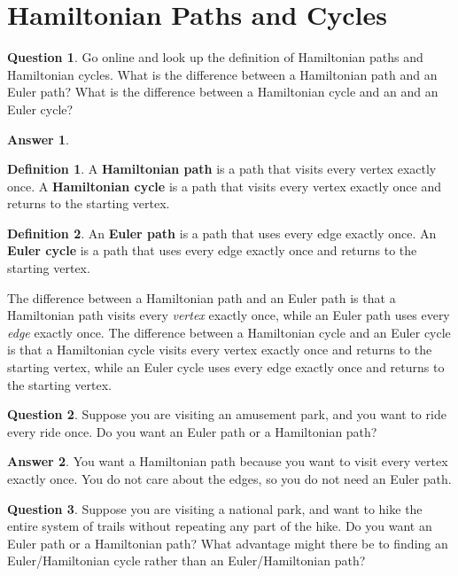 \documentclass[article, 12pt]{article}
\theoremstyle{definition}
\newtheorem{definition}{Definition}
\newtheorem{question}{Question}
\newtheorem{answer}{Answer}
\begin{document}
    \section{Hamiltonian Paths and Cycles}
    \begin{question}
        Go online and look up the definition of Hamiltonian paths and Hamiltonian cycles. What is the difference between a Hamiltonian path and an Euler path? What is the difference between a Hamiltonian cycle and an and an Euler cycle?
    \end{question}
    \begin{answer}
        \begin{definition}
            A \textbf{Hamiltonian path} is a path that visits every vertex exactly once. A \textbf{Hamiltonian cycle} is a path that visits every vertex exactly once and returns to the starting vertex.
        \end{definition}
        \begin{definition}
            An \textbf{Euler path} is a path that uses every edge exactly once. An \textbf{Euler cycle} is a path that uses every edge exactly once and returns to the starting vertex. 
        \end{definition} 
        The difference between a Hamiltonian path and an Euler path is that a Hamiltonian path visits every \textit{vertex} exactly once, while an Euler path uses every \textit{edge} exactly once. The difference between a Hamiltonian cycle and an Euler cycle is that a Hamiltonian cycle visits every vertex exactly once and returns to the starting vertex, while an Euler cycle uses every edge exactly once and returns to the starting vertex.
    \end{answer}
    \begin{question}
        Suppose you are visiting an amusement park, and you want to ride every ride once. Do you want an Euler path or a Hamiltonian path?
    \end{question}
    \begin{answer}
        You want a Hamiltonian path because you want to visit every vertex exactly once. You do not care about the edges, so you do not need an Euler path.
    \end{answer}
    \begin{question}
        Suppose you are visiting a national park, and want to hike the entire system of trails
        without repeating any part of the hike. Do you want an Euler path or a Hamiltonian
        path? What advantage might there be to finding an Euler/Hamiltonian cycle rather than
        an Euler/Hamiltonian path?
    \end{question}
\end{document}
